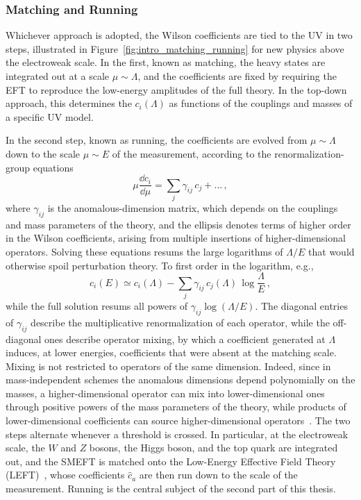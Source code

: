 \subsubsection*{Matching and Running}

Whichever approach is adopted, the Wilson coefficients are tied to the UV in two steps, illustrated
in Figure~\ref{fig:intro_matching_running} for new physics above the electroweak scale. In the
first, known as matching, the heavy states are integrated out at a scale $\mu\sim\Lambda$, and the
coefficients are fixed by requiring the EFT to reproduce the low-energy amplitudes of the full
theory. In the top-down approach, this determines the $c_i(\Lambda)$ as functions of the couplings
and masses of a specific UV model. 

In the second step, known as running, the coefficients are evolved from $\mu\sim\Lambda$ down to the
scale $\mu\sim E$ of the measurement, according to the renormalization-group
equations~\cite{Callan:1970yg,Symanzik:1970rt}
\begin{equation}\label{eq:intro_RGE}
    \mu\frac{\dd c_i}{\dd\mu} = \sum_j \gamma_{ij}\,c_j + \dots\,,
\end{equation}
where $\gamma_{ij}$ is the anomalous-dimension matrix, which depends on the couplings and mass
parameters of the theory, and the ellipsis denotes terms of higher order in the Wilson coefficients,
arising from multiple insertions of higher-dimensional operators. Solving these equations resums the
large logarithms of $\Lambda/E$ that would otherwise spoil perturbation theory. To first order in
the logarithm, e.g.,
\begin{equation}\label{eq:intro_LL}
    c_i(E) \simeq c_i(\Lambda) - \sum_j\gamma_{ij}\,c_j(\Lambda)\,\log\frac{\Lambda}{E}\,,
\end{equation}
while the full solution resums all powers of $\gamma_{ij}\log(\Lambda/E)$. The diagonal entries of
$\gamma_{ij}$ describe the multiplicative renormalization of each operator, while the off-diagonal
ones describe operator mixing, by which a coefficient generated at $\Lambda$ induces, at lower
energies, coefficients that were absent at the matching scale. Mixing is not restricted to operators
of the same dimension. Indeed, since in mass-independent schemes the anomalous dimensions depend
polynomially on the masses, a higher-dimensional operator can mix into lower-dimensional ones
through positive powers of the mass parameters of the theory, while products of lower-dimensional
coefficients can source higher-dimensional
operators~\cite{Jenkins:2013zja,Chala:2021pll,DasBakshi:2022mwk,Bresciani:2023jsu}. The two steps
alternate whenever a threshold is crossed. In particular, at the electroweak scale, the $W$ and $Z$
bosons, the Higgs boson, and the top quark are integrated out, and the SMEFT is matched onto the
Low-Energy Effective Field Theory (LEFT)~\cite{Jenkins:2017jig,Dekens:2019ept}, whose coefficients
$\widehat c_a$ are then run down to the scale of the measurement. Running is
the central subject of the second part of this thesis.

